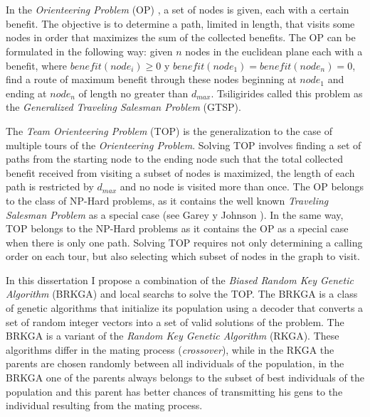 
\chapter*{\tituloAbstractEn}

\noindent In the \textit{Orienteering Problem} (OP) \cite{Tsiligirides}, a set of nodes is given, each with a certain benefit. The objective is to determine a path, limited in length, that visits some nodes in order that maximizes the sum of the collected benefits. The OP can be formulated in the following way: given $n$ nodes in the euclidean plane each with a benefit, where $benefit(node_i) \geq 0$ y $benefit(node_1) = benefit(node_n) = 0$, find a route of maximum benefit through these nodes beginning at $node_1$ and ending at $node_n$ of length no greater than $d_{max}$. Tsiligirides \cite{Tsiligirides} called this problem as the \textit{Generalized Traveling Salesman Problem} (GTSP).

\bigskip

The \textit{Team Orienteering Problem} (TOP) \cite{ChaoGoldenWasil} is the generalization to the case of multiple tours of the \textit{Orienteering Problem}. Solving TOP involves finding a set of paths from the starting node to the ending node such that the total collected benefit received from visiting a subset of nodes is maximized, the length of each path is restricted by $d_{max}$ and no node is visited more than once. The OP belongs to the class of NP-Hard problems, as it contains the well known \textit{Traveling Salesman Problem} as a special case (see Garey y Johnson \cite{GareyJohnson}). In the same way, TOP belongs to the NP-Hard problems as it contains the OP as a special case when there is only one path. Solving TOP requires not only determining a calling order on each tour, but also selecting which subset of nodes in the graph to visit.

\bigskip

In this dissertation I propose a combination of the \textit{Biased Random Key Genetic Algorithm} (BRKGA) \cite{Bean} and local searchs to solve the TOP. The BRKGA is a class of genetic algorithms that initialize its population using a decoder that converts a set of random integer vectors into a set of valid solutions of the problem. The BRKGA is a variant of the \textit{Random Key Genetic Algorithm} (RKGA). These algorithms differ in the mating process (\textit{crossover}), while in the RKGA the parents are chosen randomly between all individuals of the population, in the BRKGA one of the parents always belongs to the subset of best individuals of the population and this parent has better chances of transmitting his gens to the individual resulting from the mating process.

